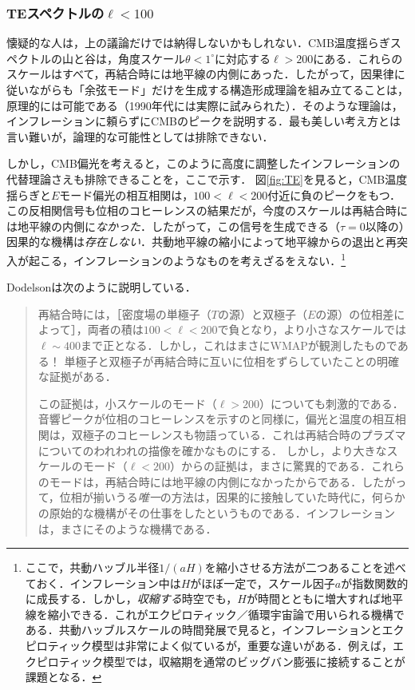 \subsubsection{TEスペクトルの$\ell < 100$}

懐疑的な人は，上の議論だけでは納得しないかもしれない．CMB温度揺らぎスペクトルの山と谷は，角度スケール$\theta < 1^\circ$に対応する$\ell >200$にある．これらのスケールはすべて，再結合時には地平線の内側にあった．したがって，因果律に従いながらも「余弦モード」だけを生成する構造形成理論を組み立てることは，原理的には可能である（1990年代には実際に試みられた）．そのような理論は，インフレーションに頼らずにCMBのピークを説明する．最も美しい考え方とは言い難いが，論理的な可能性としては排除できない．

しかし，CMB偏光を考えると，このように高度に調整したインフレーションの代替理論さえも排除できることを，ここで示す．
図\ref{fig:TE}を見ると，CMB温度揺らぎと$E$モード偏光の相互相関は，$100 < \ell < 200$付近に負のピークをもつ．この反相関信号も位相のコヒーレンスの結果だが，今度のスケールは再結合時には地平線の内側に{\it なかった}．したがって，この信号を生成できる（$\tau =0$以降の）因果的な機構は{\it 存在しない}．共動地平線の縮小によって地平線からの退出と再突入が起こる，インフレーションのようなものを考えざるをえない．\footnote{ここで，共動ハッブル半径$1/(aH)$を縮小させる方法が二つあることを述べておく．インフレーション中は$H$がほぼ一定で，スケール因子$a$が指数関数的に成長する．しかし，{\it 収縮する}時空でも，$H$が時間とともに増大すれば地平線を縮小できる．これがエクピロティック／循環宇宙論\cite{Steinhardt:2002ih, Steinhardt:2001st, Buchbinder:2007ad}で用いられる機構である．共動ハッブルスケールの時間発展で見ると，インフレーションとエクピロティック模型は非常によく似ているが，重要な違いがある．例えば，エクピロティック模型では，収縮期を通常のビッグバン膨張に接続することが課題となる．}

Dodelsonは次のように説明している\cite{Dodelson:2003ip}．
\begin{quote}
再結合時には，［密度場の単極子（$T$の源）と双極子（$E$の源）の位相差によって］，両者の積は$100< \ell < 200$で負となり，より小さなスケールでは$\ell \sim 400$まで正となる．しかし，これはまさにWMAPが観測したものである！ 単極子と双極子が再結合時に互いに位相をずらしていたことの明確な証拠がある．

この証拠は，小スケールのモード（$\ell > 200$）についても刺激的である．音響ピークが位相のコヒーレンスを示すのと同様に，偏光と温度の相互相関は，双極子のコヒーレンスも物語っている．これは再結合時のプラズマについてのわれわれの描像を確かなものにする．
しかし，より大きなスケールのモード（$\ell < 200$）からの証拠は，まさに驚異的である．これらのモードは，再結合時には地平線の内側になかったからである．したがって，位相が揃いうる{\it 唯一}の方法は，因果的に接触していた時代に，何らかの原始的な機構がその仕事をしたというものである．インフレーションは，まさにそのような機構である．
\end{quote}

